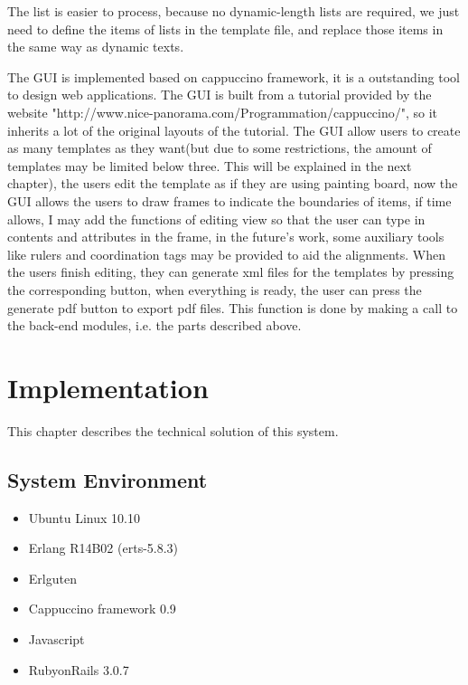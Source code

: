 \documentclass{report}
\begin{document}
  The list is easier to process, because no dynamic-length lists are required, we just need to define the items of lists in the template file, and replace those items in the same way as dynamic texts.

  The GUI is implemented based on cappuccino framework, it is a outstanding tool to design web applications. The GUI is built from a tutorial provided by the website "http://www.nice-panorama.com/Programmation/cappuccino/", so it inherits a lot of the original layouts of the tutorial. The GUI allow users to create as many templates as they want(but due to some restrictions, the amount of templates may be limited below three. This will be explained in the next chapter), the users edit the template as if they are using painting board, now the GUI allows the users to draw frames to indicate the boundaries of items, if time allows, I may add the functions of editing view so that the user can type in contents and attributes in the frame, in the future's work, some auxiliary tools like rulers and coordination tags may be provided to aid the alignments. When the users finish editing, they can generate xml files for the templates by pressing the corresponding button, when everything is ready, the user can press the generate pdf button to export pdf files. This function is done by making a call to the back-end modules, i.e. the parts described above.

\chapter{Implementation}
  This chapter describes the technical solution of this system. 
\section{System Environment}
\begin{itemize}
\item Ubuntu Linux 10.10
\item Erlang R14B02 (erts-5.8.3)
\item Erlguten 
\item Cappuccino framework 0.9
\item Javascript
\item RubyonRails 3.0.7
\end{itemize}
\end{document}
